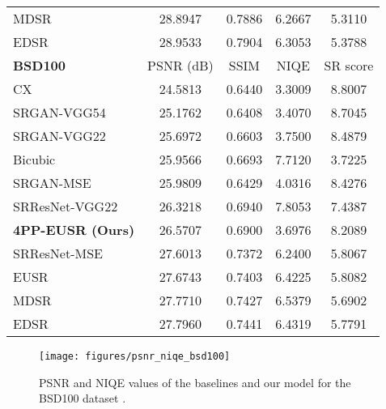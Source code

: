 \documentclass[runningheads]{llncs}
\begin{document}
\begin{table}[t]
\begin{tabular}{lcccc}
		MDSR & 28.8947 & 0.7886 & 6.2667 & 5.3110 \\
		EDSR & 28.9533 & 0.7904 & 6.3053 & 5.3788 \\
		\noalign{\smallskip}
		\noalign{\smallskip}
		\textbf{BSD100} & PSNR (dB) & SSIM & NIQE & SR score \\
		\noalign{\smallskip}
		\hline
		\noalign{\smallskip}
		CX & 24.5813 & 0.6440 & 3.3009 & 8.8007 \\
		SRGAN-VGG54 & 25.1762 & 0.6408 & 3.4070 & 8.7045 \\
		SRGAN-VGG22 & 25.6972 & 0.6603 & 3.7500 & 8.4879 \\
		Bicubic & 25.9566 & 0.6693 & 7.7120 & 3.7225 \\
		SRGAN-MSE & 25.9809 & 0.6429 & 4.0316 & 8.4276 \\
		SRResNet-VGG22 & 26.3218 & 0.6940 & 7.8053 & 7.4387 \\
		\textbf{4PP-EUSR (Ours)} & 26.5707 & 0.6900 & 3.6976 & 8.2089 \\
		SRResNet-MSE & 27.6013 & 0.7372 & 6.2400 & 5.8067 \\
		EUSR & 27.6743 & 0.7403 & 6.4225 & 5.8082 \\
		MDSR & 27.7710 & 0.7427 & 6.5379 & 5.6902 \\
		EDSR & 27.7960 & 0.7441 & 6.4319 & 5.7791
	\end{tabular}
\end{table}

\begin{figure}[t]
	\centering
	\texttt{[image: figures/psnr\_niqe\_bsd100]}
	\caption{PSNR and NIQE values of the baselines and our model for the BSD100 dataset \cite{martin2001database}.}
	\label{fig:psnr_niqe_bsd100}
\end{figure}
\end{document}
